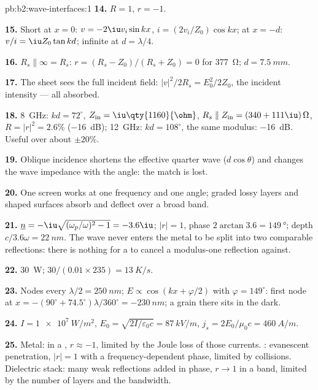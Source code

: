 \begin{solution}{pb:b2:wave-interfaces:1}
\textbf{14.} $R = 1$, $r = -1$.

\textbf{15.} Short at $x = 0$: $v = -2\iu v_i\sin kx$, $i = (2v_i/Z_0)\cos kx$;
at $x = -d$: $v/i = \iu Z_0\tan kd$; infinite at $d = \lambda/4$.

\textbf{16.} $R_s \parallel \infty = R_s$: $r = (R_s - Z_0)/(R_s + Z_0) = 0$ for
\qty{377}{\ohm}; $d = \qty{7.5}{mm}$.

\textbf{17.} The sheet sees the full incident field: $|v|^2/2R_s =
E_0^2/2Z_0$, the incident intensity --- all absorbed.

\textbf{18.} \qty{8}{GHz}: $kd = 72^\circ$, $Z_{\text{in}} = \iu\qty{1160}{\ohm}$, $R_s \parallel
Z_{\text{in}} = (340 + 111\iu)\,\Omega$, $R = |r|^2 = 2.6\%$ (\qty{-16}{dB}); \qty{12}{GHz}:
$kd = 108^\circ$, the same modulus: \qty{-16}{dB}. Useful over about $\pm20\%$.

\textbf{19.} Oblique incidence shortens the effective quarter wave
($d\cos\theta$) and changes the wave impedance with the angle: the
match is lost.

\textbf{20.} One screen works at one frequency and one angle; graded
lossy layers and shaped surfaces absorb and deflect over a broad band.

\textbf{21.} $\underline n = -\iu\sqrt{(\omega_p/\omega)^2 - 1} = -3.6\iu$; $|r| = 1$, phase
$2\arctan3.6 = \qty{149}{\degree}$; depth $c/3.6\omega = \qty{22}{nm}$. The wave never
enters the metal to be split into two comparable reflections: there is
nothing for a  to cancel a modulus-one reflection
against.

\textbf{22.} \qty{30}{W}; $30/(0.01 \times 235) = \qty{13}{K/s}$.

\textbf{23.} Nodes every $\lambda/2 = \qty{250}{nm}$; $E \propto \cos(kx + \varphi/2)$ with $\varphi =
149^\circ$: first node at $x = -(90^\circ + 74.5^\circ)\lambda/360^\circ = \qty{-230}{nm}$; a
grain there sits in the dark.

\textbf{24.} $I = \qty{1e7}{W/m^2}$, $E_0 = \sqrt{2I/\varepsilon_0c} = \qty{87}{kV/m}$, $j_s =
2E_0/\mu_0c = \qty{460}{A/m}$.

\textbf{25.} Metal:  in a , $r \approx -1$, limited
by the Joule loss of those currents. : evanescent penetration,
$|r| = 1$ with a frequency-dependent phase, limited by collisions.
Dielectric stack: many weak reflections added in phase, $r \to 1$ in a
band, limited by the number of layers and the bandwidth.
\end{solution}
